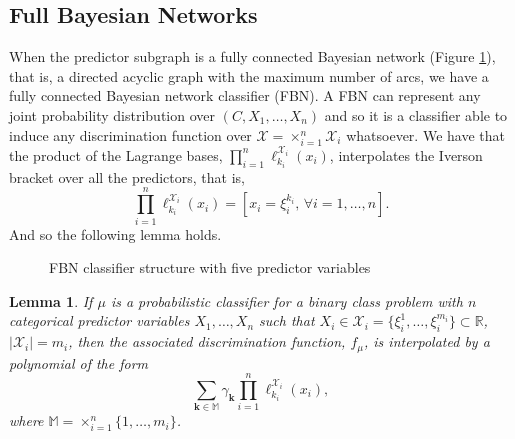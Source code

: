 \documentclass[11pt,a4paper, twoside]{book}
\newtheorem{lemma}{Lemma}[chapter]
\newcommand{\bchi}{\boldsymbol{\mathcal{X}}}
\newcommand{\nchi}{\mathcal{X}}
\begin{document}
\subsection{Full Bayesian Networks}
\label{subsec:FBN}
When the predictor subgraph is a fully connected Bayesian network (Figure \ref{fig:FBN}), that is, a directed acyclic graph with the maximum number of arcs, we have a fully connected Bayesian network classifier (FBN). A FBN can represent any joint probability distribution over $(C,X_1,\ldots,X_n)$ and so it is a classifier able to induce any discrimination function over $\bchi=\times_{i=1}^n\nchi_i$ whatsoever. We have that the product of the Lagrange bases, $\prod_{i=1}^n \ell^{\nchi_i}_{k_i}(x_i)$, interpolates the Iverson bracket over all the predictors, that is,
\[ \prod_{i=1}^n \ell^{\nchi_i}_{k_i}(x_i)=[ x_i=\xi_i^{k_i} \text{, } \forall i=1,\ldots,n]. \] 
And so the following lemma holds.
\begin{figure}
\centering
{}  
\caption{FBN classifier structure with five predictor variables}
\label{fig:FBN}
\end{figure}
\begin{lemma}
\label{lem:gen class}
If $\mu$ is a probabilistic classifier for a binary class problem with $n$ categorical predictor variables $X_1,\ldots,X_n$ such that $X_i \in \nchi_i=\{\xi_i^1,\ldots,\xi_i^{m_i}\}\subset \mathbb{R}$, $|\nchi_i|=m_i$, then the associated discrimination function, $f_{\mu}$, is interpolated by a polynomial of the form  $$\sum_{\mathbf{k}\in\mathbb{M}} \gamma_{\mathbf{k}} \prod_{i=1}^n \ell^{\nchi_i}_{k_i}(x_i), $$
where $\mathbb{M}=\times_{i=1}^n \{1,\ldots,m_i\}$. 
  \end{lemma} 
\end{document}
